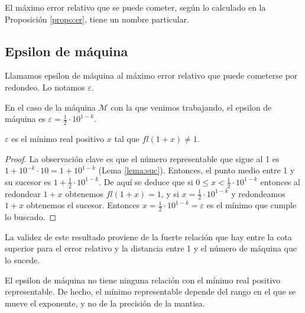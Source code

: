 El máximo error relativo que se puede cometer, según lo calculado en la Proposición \ref{propo:er}, tiene un nombre particular.

\subsection{Epsilon de máquina}

\begin{defi}
Llamamos epsilon de máquina al máximo error relativo que puede cometerse por redondeo. Lo notamos $\varepsilon$.
\end{defi}

En el caso de la máquina $\mathcal{M}$ con la que venimos trabajando, el epsilon de máquina es $\varepsilon = \frac{1}{2} \cdot 10^{1 - k}$.

\begin{propo}
$\varepsilon$ es el mínimo real positivo $x$ tal que $fl(1 + x) \neq 1$.

\begin{proof}
La observación clave es que el número representable que sigue al 1 es $1 + 10^{-k} \cdot 10 = 1 + 10^{1 - k}$ (Lema \ref{lema:suc}). Entonces, el punto medio entre 1 y su sucesor es $1 + \frac{1}{2} \cdot 10^{1 - k}$. De aquí se deduce que si $0 \leq x < \frac{1}{2} \cdot 10^{1 - k}$ entonces al redondear $1 + x$ obtenemos $fl(1 + x) = 1$, y si $x = \frac{1}{2} \cdot 10^{1 - k}$ y redondeamos $1 + x$ obtenemos el sucesor. Entonces $x = \frac{1}{2} \cdot 10^{1 - k} = \varepsilon$ es el mínimo que cumple lo buscado.
\end{proof}
\end{propo}

\begin{obs}
La validez de este resultado proviene de la fuerte relación que hay entre la cota superior para el error relativo y la distancia entre 1 y el número de máquina que lo sucede.
\end{obs}

\begin{obs}
El epsilon de máquina no tiene ninguna relación con el mínimo real positivo representable. De hecho, el mínimo representable depende del rango en el que se mueve el exponente, y no de la precisión de la mantisa.
\end{obs}


